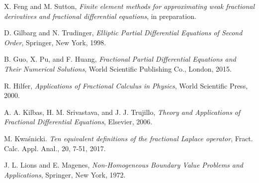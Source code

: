 \documentclass[leqno,final]{siamltex}
\numberwithin{equation}{section}
\renewcommand{\(}{\bigl(}
\renewcommand{\)}{\bigr)}
\begin{document}
\begin{thebibliography}{99}

{\sc X. Feng and M. Sutton},
{\em  Finite element methods for approximating weak fractional derivatives and fractional differential equations},
in preparation.

{\sc D. Gilbarg and N. Trudinger},
{\em Elliptic Partial Differential Equations of Second Order},
Springer, New York, 1998.

{\sc B. Guo, X. Pu, and  F. Huang},
{\em Fractional Partial Differential Equations and Their Numerical Solutions}, 
World Scientific Publishing Co.,  London,  2015.


{\sc R. Hilfer},
{\em  Applications of Fractional Calculus in Physics},
World Scientific Press, 2000.




{\sc A. A. Kilbas, H. M. Srivastava, and J. J. Trujillo},
{\em Theory and Applications of Fractional Differential Equations}, 
Elsevier, 2006. 	



{\sc M. Kwa\'snicki}.
{\em  Ten equivalent definitions of the fractional Laplace operator},
	Fract. Calc. Appl. Anal., 20, 7-51, 2017.
   
{\sc J. L. Lions and E. Magenes},
{\em Non-Homogeneous Boundary Value Problems and Applications},
Springer, New York, 1972. 



\end{thebibliography}
\end{document}
